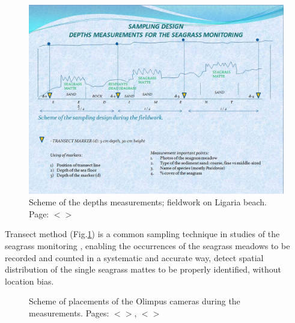 \documentclass[11pt]{article}
\begin{document}
\begin{figure}[H]
	\begin{center}
		\includegraphics[scale=0.35]{Sampling_design.jpg}
		\caption{Scheme of the depths measurements; fieldwork on Ligaria beach. Page: $<$\pageref{page-26}$>$}\label{fig:A.4}
	\end{center}	
\end{figure}

Transect method (Fig.\ref{fig:A.4}) is a common sampling technique in studies of the seagrass monitoring \cite{Shortis07}\label{Shortis07},
enabling the occurrences of the seagrass meadows to be recorded and counted in a systematic and
accurate way, detect spatial distribution of the single seagrass mattes to be properly identified,
without location bias. 

\begin{figure}[H]
	\centering
	\caption{Scheme of placements of the Olimpus cameras during the measurements. Pages: $<$\pageref{page-26}$>$, $<$\pageref{page-27}$>$}
	\label{fig:3.5}
\end{figure}
\end{document}
